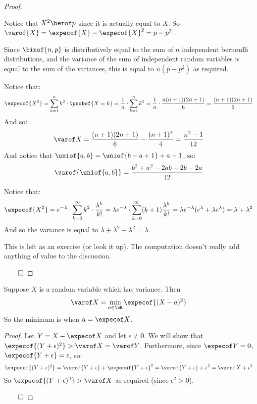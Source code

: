 \begin{proof}

	\begin{msecenumerate}[0pt]
		\mitem Notice that $X^2\berof p$ since it is actually equal to $X$.
		So $\varof{X}=\expecof{X}-\expecof{X}^2=p-p^2$.

		\mitem Since $\binof{n,p}$ is distributively equal to the sum of $n$ independent bernoulli distributions,
		and the variance of the sum of independent random variables is equal to the sum of the variances, this is
		equal to $n(p-p^2)$ as required.

		\mitem Notice that:
		\[ \expecof{X^2} = \sum_{k=1}^n k^2\cdot\probof{X=k} = \frac1n\cdot\sum_{k=1}^n k^2 =
		\frac1n\cdot\frac{n(n+1)(2n+1)}6 = \frac{(n+1)(2n+1)}6 \]
		And so:
		\[ \varof X = \frac{(n+1)(2n+1)}6 - \frac{(n+1)^2}4 = \frac{n^2-1}{12} \]
		And notice that $\uniof{a,b}=\uniof{b-a+1}+a-1$, so:
		\[ \varof{\uniof{a,b}} = \frac{b^2+a^2-2ab+2b-2a}{12} \]

		\mitem Notice that:
		\[ \expecof{X^2} = e^{-\lambda}\cdot\sum_{k=0}^\infty k^2\cdot\frac{\lambda^k}{k!} = 
		\lambda e^{-\lambda}\cdot\sum_{k=0}^\infty (k+1)\frac{\lambda^k}{k!} =
		\lambda e^{-\lambda}(e^\lambda+\lambda e^\lambda) = \lambda + \lambda^2 \]
		And so the variance is equal to $\lambda+\lambda^2-\lambda^2=\lambda$.

		\mitem This is left as an exercise (or look it up).
		The computation doesn't really add anything of value to the discussion.
	\end{msecenumerate}

	\hfill$\qed$

\end{proof}

\begin{prop*}

	Suppose $X$ is a random variable which has variance.
	Then
	\[ \varof X=\min\limits_{a\in\bR}\expecof{(X-a)^2} \]
	So the minimum is when $a=\expecof X$.

\end{prop*}

\begin{proof}

	Let $Y=X-\expecof X$ and let $\epsilon\neq0$.
	We will show that $\expecof{(Y+\epsilon)^2}>\varof X = \varof Y$.
	Furthermore, since $\expecof Y=0$, $\expecof{Y+\epsilon}=\epsilon$, so:
	\[ \expecof{(Y+\epsilon)^2}=\varof{Y+\epsilon}+\expecof{Y+\epsilon}^2=\varof{Y+\epsilon}+\epsilon^2 = \varof X + \epsilon^2 \]
	So $\expecof{(Y+\epsilon)^2} > \varof X$ as required (since $\epsilon^2>0$).

	\hfill$\qed$

\end{proof}

